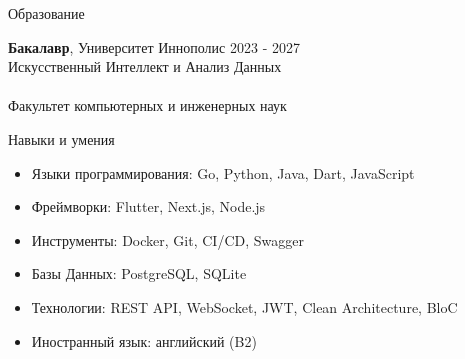 \documentclass{style} %
\begin{document}


\begin{rSection}{Образование}

    {\bf Бакалавр}, Университет Иннополис \hfill {2023 - 2027}\\
    Искусственный Интеллект и Анализ Данных\\\\
    Факультет компьютерных и инженерных наук

\end{rSection}


\begin{rSection}{Навыки и умения}

\begin{itemize}
    \itemsep -3pt {}
     \item Языки программирования: Go, Python, Java, Dart, JavaScript
     \item Фреймворки: Flutter, Next.js, Node.js
     \item Инструменты: Docker, Git, CI/CD,  Swagger
     \item Базы Данных: PostgreSQL, SQLite
     \item Технологии: REST API, WebSocket, JWT, Clean Architecture, BloC
     \item Иностранный язык: английский (B2)
\end{itemize}

\end{rSection}

\end{document}
